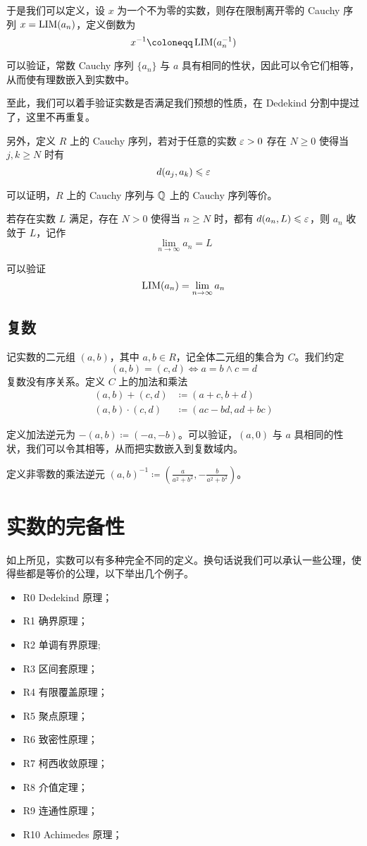 于是我们可以定义，设 $x$ 为一个不为零的实数，则存在限制离开零的 Cauchy 序列 $x=\operatorname{{LIM}}(a_n)$，定义倒数为
$$x^{-1} \coloneqq  \LIM(a_n^{-1})$$

可以验证，常数 Cauchy 序列 $\{a_n\}$ 与 $a$ 具有相同的性状，因此可以令它们相等，从而使有理数嵌入到实数中。

至此，我们可以着手验证实数是否满足我们预想的性质，在 Dedekind 分割中提过了，这里不再重复。

另外，定义 $R$ 上的 Cauchy 序列，若对于任意的实数 $\varepsilon > 0$ 存在 $N \geqslant 0$ 使得当 $j,k \geqslant N$ 时有
$$d(a_j,a_k) \leqslant \varepsilon$$

可以证明，$R$ 上的 Cauchy 序列与 $\mathbb{Q}$ 上的 Cauchy 序列等价。

若存在实数 $L$ 满足，存在 $N>0$ 使得当 $n \geqslant N$ 时，都有 $d(a_n,L) \leqslant \varepsilon$，则 $a_n$ 收敛于 $L$，记作
$$\lim_{n\to \infty} a_n = L$$

可以验证
$$\operatorname{{LIM}}(a_n) = \lim_{n\to \infty} a_n$$

\subsection{复数}

记实数的二元组 $(a,b)$，其中 $a,b\in R$，记全体二元组的集合为 $C$。我们约定
\[(a,b) = (c,d) \Leftrightarrow a=b \land  c=d\]
复数没有序关系。定义 $C$ 上的加法和乘法
\[\begin{aligned}
		(a,b) + (c,d)     & \coloneqq  (a+c,b+d)     \\
		(a,b) \cdot (c,d) & \coloneqq  (ac-bd,ad+bc)
	\end{aligned}\]

定义加法逆元为 $-(a,b) \coloneqq  (-a,-b)$。可以验证，$(a,0)$ 与 $a$ 具相同的性状，我们可以令其相等，从而把实数嵌入到复数域内。

定义非零数的乘法逆元 $(a,b)^{-1} \coloneqq  \left(\frac{a}{a^2+b^2},-\frac{b}{a^2+b^2}\right)$。

\section{实数的完备性}

如上所见，实数可以有多种完全不同的定义。换句话说我们可以承认一些公理，使得些都是等价的公理，以下举出几个例子。

\begin{itemize}
	\item R0 Dedekind 原理；
	\item R1 确界原理；
	\item R2 单调有界原理;
	\item R3 区间套原理；
	\item R4 有限覆盖原理；
	\item R5 聚点原理；
	\item R6 致密性原理；
	\item R7 柯西收敛原理；
	\item R8 介值定理；
	\item R9 连通性原理；
	\item R10 Achimedes 原理；
\end{itemize}

